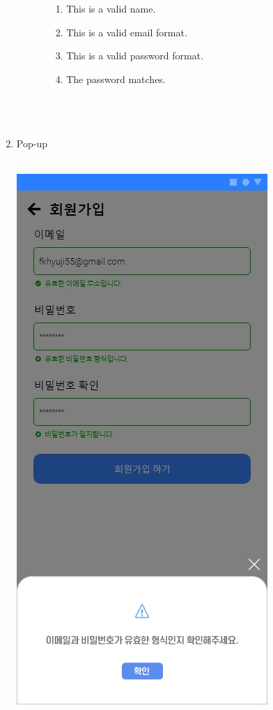 \documentclass[conference]{IEEEtran}
\begin{document}
\begin{enumerate}
\begin{itemize}
\begin{enumerate}
    \begin{enumerate}
\item This is a valid name.
\item This is a valid email format.
\item This is a valid password format.
\item The password matches.\\ \\ \\ \\
    \end{enumerate}
        \end{enumerate}
          \end{itemize}
    \item Pop-up \\\\
    \centerline{\includegraphics[scale=0.32]{4-3. 회원가입 팝업.jpg}}

\end{enumerate}
\end{document}
